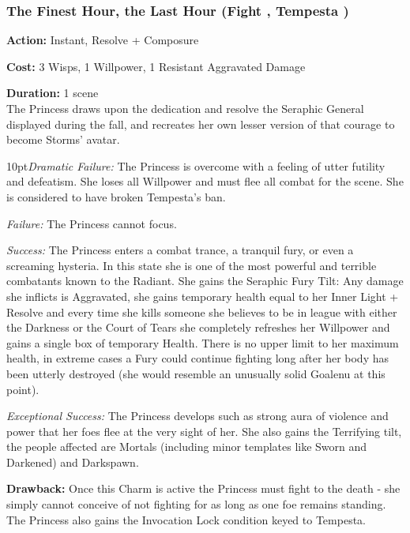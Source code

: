 \subsubsection*{The Finest Hour, the Last Hour (Fight \textbullet\textbullet\textbullet\textbullet\textbullet, Tempesta \textbullet\textbullet\textbullet\textbullet)}

\noindent \textbf{Action:} Instant, Resolve + Composure

\noindent \textbf{Cost:} 3 Wisps, 1 Willpower, 1 Resistant Aggravated Damage

\noindent \textbf{Duration:} 1 scene \\

\noindent The Princess draws upon the dedication and resolve the Seraphic General displayed during the fall, and recreates her own lesser version of that courage to become Storms' avatar. 

    \begin{myindentpar}{10pt}\emph{Dramatic Failure:} The Princess is overcome with a feeling of utter futility and defeatism. She loses all Willpower and must flee all combat for the scene. She is considered to have broken Tempesta's ban.

    \emph{Failure:} The Princess cannot focus.

    \emph{Success:} The Princess enters a combat trance, a tranquil fury, or even a screaming hysteria. In this state she is one of the most powerful and terrible combatants known to the Radiant. She gains the Seraphic Fury Tilt: Any damage she inflicts is Aggravated, she gains temporary health equal to her Inner Light + Resolve and every time she kills someone she believes to be in league with either the Darkness or the Court of Tears she completely refreshes her Willpower and gains a single box of temporary Health. There is no upper limit to her maximum health, in extreme cases a Fury could continue fighting long after her body has been utterly destroyed (she would resemble an unusually solid Goalenu at this point). 

    \emph{Exceptional Success:} The Princess develops such as strong aura of violence and power that her foes flee at the very sight of her. She also gains the Terrifying tilt, the people affected are Mortals (including minor templates like Sworn and Darkened) and Darkspawn.\end{myindentpar}

\textbf{Drawback:} Once this Charm is active the Princess must fight to the death - she simply cannot conceive of not fighting for as long as one foe remains standing. The Princess also gains the Invocation Lock condition keyed to Tempesta.

